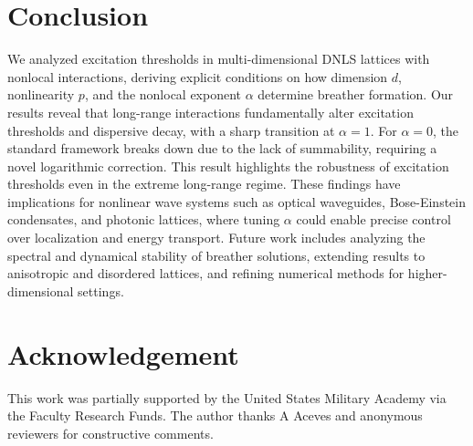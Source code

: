 \documentclass{article}
\numberwithin{equation}{section}
\begin{document}
\section{Conclusion}

We analyzed excitation thresholds in multi-dimensional DNLS lattices with nonlocal interactions, deriving explicit conditions on how dimension $d$, nonlinearity $p$, and the nonlocal exponent $\alpha$ determine breather formation. Our results reveal that long-range interactions fundamentally alter excitation thresholds and dispersive decay, with a sharp transition at $\alpha = 1$. For $\alpha = 0$, the standard framework breaks down due to the lack of summability, requiring a novel logarithmic correction. This result highlights the robustness of excitation thresholds even in the extreme long-range regime. These findings have implications for nonlinear wave systems such as optical waveguides, Bose-Einstein condensates, and photonic lattices, where tuning $\alpha$ could enable precise control over localization and energy transport. Future work includes analyzing the spectral and dynamical stability of breather solutions, extending results to anisotropic and disordered lattices, and refining numerical methods for higher-dimensional settings.

\section*{\fontsize{12}{20}\selectfont Acknowledgement}
This work was partially supported by the United States Military Academy via the Faculty Research Funds. The author thanks A Aceves and anonymous reviewers for constructive comments. 
\appendix
\end{document}
